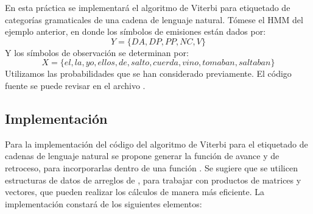 En esta práctica se implementará el algoritmo de Viterbi para etiquetado de categorías gramaticales de una cadena de lenguaje natural. 
Tómese el HMM del ejemplo anterior, en donde los símbolos de emisiones están dados por: $$Y = \{DA, DP, PP, NC, V\}$$ Y los símbolos de observación se determinan por: $$X = \{el, la, yo, ellos, de, salto, cuerda, vino, tomaban, saltaban\}$$
Utilizamos las probabilidades que se han considerado previamente. El código fuente se puede revisar en el archivo .

\subsection{Implementación}

Para la implementación del código del algoritmo de Viterbi para el etiquetado de cadenas de lenguaje natural se propone generar la función de avance y de retroceso, para incorporarlas dentro de una función . Se sugiere que se utilicen estructuras de datos de arreglos de , para trabajar con productos de matrices y vectores, que pueden realizar los cálculos de manera más eficiente. La implementación constará de los siguientes elementos:

